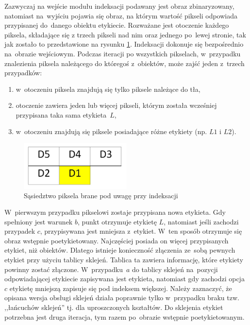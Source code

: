 Zazwyczaj na wejście modułu indeksacji podawany jest obraz zbinaryzowany, natomiast na~wyjściu pojawia się obraz, na którym  wartość  pikseli odpowiada przypisanej do~danego obiektu etykiecie. 
Rozważane jest otoczenie każdego piksela, składające się z trzech pikseli nad nim oraz jednego po~lewej stronie, tak jak zostało to przedstawione na rysunku \ref{fig:ind_sasiedztwo}. 
Indeksacji dokonuje się bezpośrednio na~obrazie wejściowym. 
Podczas iteracji po wszystkich pikselach, w~przypadku znalezienia piksela należącego do któregoś z~obiektów, może zajść jeden z~trzech przypadków:
\begin{enumerate}[label=(\alph*)]
	\item w~otoczeniu piksela znajdują się tylko piksele należące do tła,
	\item otoczenie zawiera jeden lub więcej pikseli, którym została wcześniej przypisana taka sama etykieta~$L$,
	\item w~otoczeniu znajdują się piksele posiadające różne etykiety (np. $L1$ i $L2$).
\end{enumerate} 
\begin{figure}[h]
	\centering
	\includegraphics[width=0.5\textwidth]{ind_sasiedztwo.jpg}
	\caption{Sąsiedztwo piksela brane pod uwagę przy indeksacji}
	\label{fig:ind_sasiedztwo}
\end{figure}

W~pierwszym przypadku pikselowi zostaje przypisana nowa etykieta. 
Gdy spełniony jest warunek $b$, punkt otrzymuje etykietę $L$, natomiast jeśli zachodzi przypadek $c$, przypisywana jest mniejsza z~etykiet. 
W~ten sposób otrzymuje się obraz wstępnie poetykietowany. 
Najczęściej posiada on więcej przypisanych etykiet, niż obiektów. 
Dlatego istnieje konieczność złączenia ze~sobą pewnych etykiet przy użyciu tablicy sklejeń. 
Tablica ta zawiera informację, które etykiety powinny zostać złączone. 
W~przypadku~$a$ do tablicy sklejeń na~pozycji odpowiadającej etykiecie zapisywana jest etykieta, natomiast gdy zachodzi opcja~$c$ etykietę mniejszą zapisuje się pod indeksem większej. 
Należy zaznaczyć, że opisana wersja obsługi sklejeń działa poprawnie tylko w~przypadku braku tzw. ,,łańcuchów sklejeń'' tj. dla uproszczonych kształtów. %
Do sklejenia etykiet potrzebna jest druga iteracja, tym razem po~obrazie wstępnie poetykietowanym.

